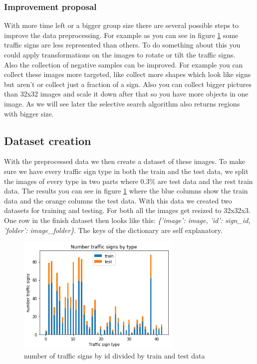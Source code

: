 \documentclass[12pt,a4paper,bibliography=totocnumbered,listof=totocnumbered]{scrartcl}
\begin{document}
\subsubsection{Improvement proposal}\label{second_approach}
With more time left or a bigger group size there are several possible steps to improve the data preprocessing. For example as you can see in figure \ref{fig:data_hist} some traffic signs are less represented than others. To do something about this you could apply transformations on the images to rotate or tilt the traffic signs.\\
Also the collection of negative samples can be improved. For example you can collect these images more targeted, like collect more shapes which look like signs but aren't or collect just a fraction of a sign. Also you can collect bigger pictures than 32x32 images and scale it down after that so you have more objects in one image. As we will see later the selective search algorithm also returns regions with bigger size.

\subsection{Dataset creation}

With the preprocessed data we then create a dataset of these images. To make sure we have every traffic sign type in both the train and the test data, we split the images of every type in two parts where 0.3\% are test data and the rest train data. The results you can see in figure \ref{fig:data_hist} where the blue columns show the train data and the orange columns the test data. With this data we created two datasets for training and testing. For both all the images get resized to 32x32x3. One row in the finish dataset then looks like this: \textit{\{'image': image, 'id': sign\_id, 'folder': image\_folder\}}. The keys of the dictionary are self explanatory.

\begin{figure}[htbp] 
  \centering
     \includegraphics[width=0.7\textwidth]{data_hist}
  \caption{number of traffic signs by id divided by train and test data}
  \label{fig:data_hist}
\end{figure}
\end{document}
